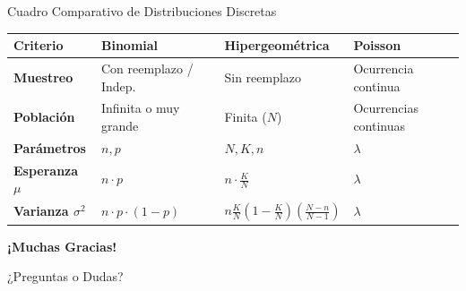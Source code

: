 \documentclass[aspectratio=169, 10pt]{beamer}
\begin{document}
\begin{frame}{Cuadro Comparativo de Distribuciones Discretas}
    \begin{table}
        \centering
        \small
        \begin{tabular}{p{2.2cm} p{3.2cm} p{3.2cm} p{3.2cm}}
            \toprule
            \textbf{Criterio} & \textbf{Binomial} & \textbf{Hipergeométrica} & \textbf{Poisson} \\
            \midrule
            \textbf{Muestreo} & Con reemplazo / Indep. & Sin reemplazo & Ocurrencia continua \\
            \textbf{Población} & Infinita o muy grande & Finita ($N$) & Ocurrencias continuas \\
            \textbf{Parámetros} & $n, p$ & $N, K, n$ & $\lambda$ \\
            \textbf{Esperanza $\mu$} & $n \cdot p$ & $n \cdot \frac{K}{N}$ & $\lambda$ \\
            \textbf{Varianza $\sigma^2$} & $n \cdot p \cdot (1-p)$ & $n \frac{K}{N} \left(1-\frac{K}{N}\right) \left(\frac{N-n}{N-1}\right)$ & $\lambda$ \\
            \bottomrule
        \end{tabular}
    \end{table}
\end{frame}

\begin{frame}
    \centering
    \Huge \textbf{¡Muchas Gracias!}
    
    \vspace{0.5cm}
    \Large ¿Preguntas o Dudas?
\end{frame}
\end{document}
